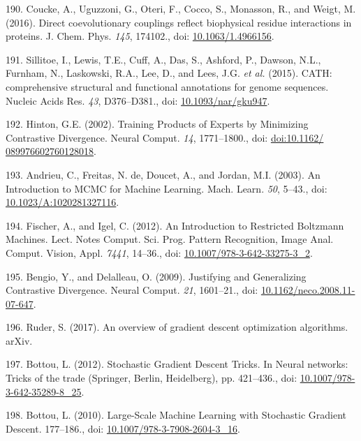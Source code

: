 \documentclass[11pt,a4paper,twoside]{book}
\theoremstyle{definition}
\theoremstyle{definition}
\theoremstyle{remark}
\begin{document}
\hypertarget{ref-Coucke2016}{}
190. Coucke, A., Uguzzoni, G., Oteri, F., Cocco, S., Monasson, R., and
Weigt, M. (2016). Direct coevolutionary couplings reflect biophysical
residue interactions in proteins. J. Chem. Phys. \emph{145}, 174102.,
doi: \href{https://doi.org/10.1063/1.4966156}{10.1063/1.4966156}.

\hypertarget{ref-Sillitoe2015}{}
191. Sillitoe, I., Lewis, T.E., Cuff, A., Das, S., Ashford, P., Dawson,
N.L., Furnham, N., Laskowski, R.A., Lee, D., and Lees, J.G. \emph{et
al.} (2015). CATH: comprehensive structural and functional annotations
for genome sequences. Nucleic Acids Res. \emph{43}, D376--D381., doi:
\href{https://doi.org/10.1093/nar/gku947}{10.1093/nar/gku947}.

\hypertarget{ref-Hinton2002}{}
192. Hinton, G.E. (2002). Training Products of Experts by Minimizing
Contrastive Divergence. Neural Comput. \emph{14}, 1771--1800., doi:
\href{https://doi.org/doi:10.1162/\%20089976602760128018}{doi:10.1162/ 089976602760128018}.

\hypertarget{ref-Andrieu2003}{}
193. Andrieu, C., Freitas, N. de, Doucet, A., and Jordan, M.I. (2003).
An Introduction to MCMC for Machine Learning. Mach. Learn. \emph{50},
5--43., doi:
\href{https://doi.org/10.1023/A:1020281327116}{10.1023/A:1020281327116}.

\hypertarget{ref-Fischer2012}{}
194. Fischer, A., and Igel, C. (2012). An Introduction to Restricted
Boltzmann Machines. Lect. Notes Comput. Sci. Prog. Pattern Recognition,
Image Anal. Comput. Vision, Appl. \emph{7441}, 14--36., doi:
\href{https://doi.org/10.1007/978-3-642-33275-3_2}{10.1007/978-3-642-33275-3\_2}.

\hypertarget{ref-Bengio2009}{}
195. Bengio, Y., and Delalleau, O. (2009). Justifying and Generalizing
Contrastive Divergence. Neural Comput. \emph{21}, 1601--21., doi:
\href{https://doi.org/10.1162/neco.2008.11-07-647}{10.1162/neco.2008.11-07-647}.

\hypertarget{ref-Ruder2017}{}
196. Ruder, S. (2017). An overview of gradient descent optimization
algorithms. arXiv.

\hypertarget{ref-Bottou2012}{}
197. Bottou, L. (2012). Stochastic Gradient Descent Tricks. In Neural
networks: Tricks of the trade (Springer, Berlin, Heidelberg), pp.
421--436., doi:
\href{https://doi.org/10.1007/978-3-642-35289-8_25}{10.1007/978-3-642-35289-8\_25}.

\hypertarget{ref-Bottou2010}{}
198. Bottou, L. (2010). Large-Scale Machine Learning with Stochastic
Gradient Descent. 177--186., doi:
\href{https://doi.org/10.1007/978-3-7908-2604-3_16}{10.1007/978-3-7908-2604-3\_16}.
\end{document}
